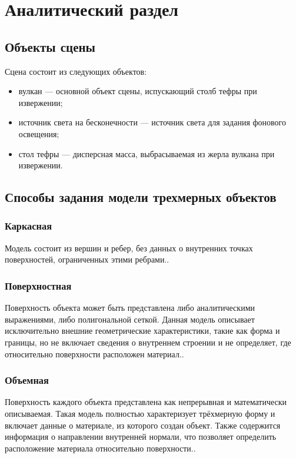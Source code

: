 \chapter{Аналитический раздел}
\section{Объекты сцены}
Сцена состоит из следующих объектов:
\begin{itemize}
	\item вулкан --- основной объект сцены, испускающий столб тефры при извержении;
	\item источник света на бесконечности --- источник света для задания фонового освещения;
	\item стол тефры --- дисперсная масса, выбрасываемая из жерла вулкана при извержении.
\end{itemize}

\section{Способы задания модели трехмерных объектов}

\subsection{Каркасная}
Модель состоит из вершин и ребер, без данных о внутренних точках поверхностей, ограниченных этими ребрами.\cite{lit2}.

\subsection{Поверхностная}
Поверхность объекта может быть представлена либо аналитическими выражениями, либо полигональной сеткой. Данная модель описывает исключительно внешние геометрические характеристики, такие как форма и границы, но не включает сведения о внутреннем строении и не определяет, где относительно поверхности расположен материал.\cite{lit2}.

\subsection{Объемная}
Поверхность каждого объекта представлена как непрерывная и математически описываемая. Такая модель полностью характеризует трёхмерную форму и включает данные о материале, из которого создан объект. Также содержится информация о направлении внутренней нормали, что позволяет определить расположение материала относительно поверхности.\cite{lit2}.


